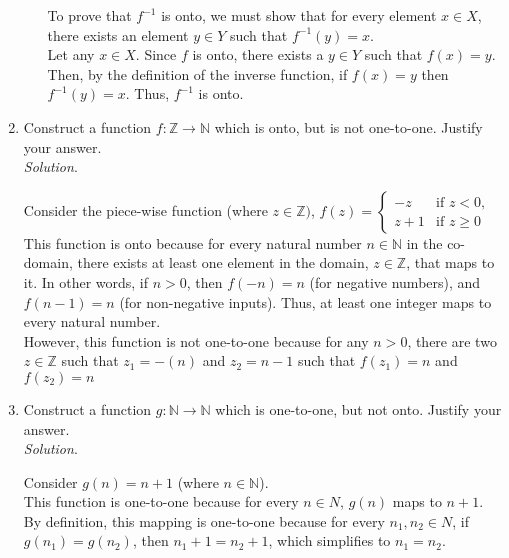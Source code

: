 \documentclass[10pt]{article}
\newenvironment{solution}{\textit{Solution}.}
\newcommand{\proofseparator}{\noindent\makebox[\linewidth]{\rule{\textwidth}{0.4pt}}}
\newcommand{\sol}[1]{
    \vspace{5pt}
    \begin{solution}
    #1
    \end{solution}
    \proofseparator
}
\newcommand{\N}{\ensuremath{\mathbb{N}}}
\newcommand{\Z}{\ensuremath{\mathbb{Z}}}
\begin{document}
\begin{enumerate}
\begin{enumerate}
{                        To prove that $f^{-1}$ is onto, we must show that for every element $x\in X$, there exists an element $y\in Y$ such that $f^{-1}(y) = x$. \\

                        Let any $x\in X$. Since $f$ is onto, there exists a $y\in Y$ such that $f(x) = y$. Then, by the definition of the inverse function, if $f(x) = y$ then $f^{-1}(y) = x$. Thus, $f^{-1}$ is onto.
                    }
          \end{enumerate}

          \vspace{0.3cm}

    \item Construct a function $f \colon \Z \rightarrow \N$ which is onto, but is not one-to-one. Justify your answer. \\

          \sol{
              Consider the piece-wise function (where $z\in \Z)$,
              $f(z) =
                  \begin{cases}
                      -z    & \text{if } z < 0,   \\
                      z + 1 & \text{if } z \geq 0
                  \end{cases} $ \\

              This function is onto because for every natural number $n\in \N$ in the co-domain, there exists at least one element in the domain, $z\in \Z$, that maps to it. In other words, if $n > 0$, then $f(-n) = n$ (for negative numbers), and $f(n-1) = n$ (for non-negative inputs). Thus, at least one integer maps to every natural number. \\

              However, this function is not one-to-one because for any $n > 0$, there are two $z\in \Z$ such that $z_1 = -(n)$ and $z_2 = n - 1$ such that $f(z_1) = n$ and $f(z_2) = n$
          }

          \newpage

    \item Construct a function $g\colon \N \rightarrow \N$ which is one-to-one, but not onto. Justify your answer. \\

          \sol{
              Consider $g(n) = n + 1$ (where $n\in \N$). \\

              This function is one-to-one because for every $n\in N$, $g(n)$ maps to $n + 1$. By definition, this mapping is one-to-one because for every $n_1,n_2 \in N$, if $g(n_1) = g(n_2)$, then $n_1 + 1 = n_2 + 1$, which simplifies to $n_1 = n_2$. \\

}
\end{enumerate}
\end{document}
